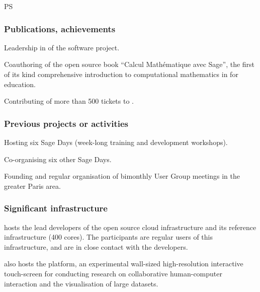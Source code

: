 \begin{sitedescription}{PS}

\subsubsection*{Publications, achievements}

\begin{compactenum}
\item Leadership in of the \SageCombinat software project.
\item Coauthoring of the open source book ``Calcul Mathématique avec
  Sage'', the first of its kind comprehensive introduction to
  computational mathematics in \Sage for education.
\item Contributing of more than 500 tickets to \Sage.
\end{compactenum}


\subsubsection*{Previous projects or activities}

\begin{compactenum}
\item Hosting six Sage Days (week-long training and development workshops).
\item Co-organising six other Sage Days.
\item Founding and regular organisation of bimonthly \Sage User Group
  meetings in the greater Paris area.
\end{compactenum}

\subsubsection*{Significant infrastructure}

 hosts the lead developers of the open source
cloud infrastructure  and its reference
infrastructure (400 cores). The participants are regular users
of this infrastructure, and are in close contact with the developers.

 also hosts the  platform, an experimental wall-sized
high-resolution interactive touch-screen for conducting research on
collaborative human-computer interaction and the visualisation of
large datasets.

\end{sitedescription}



